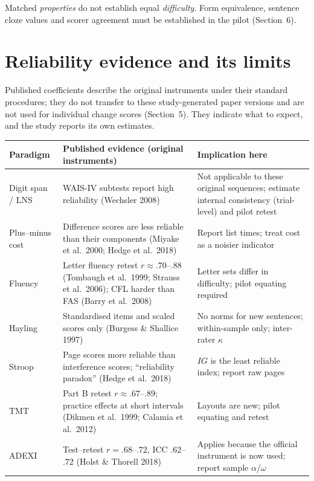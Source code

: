 \documentclass[11pt,a4paper]{article}
\begin{document}
Matched \emph{properties} do not establish equal \emph{difficulty}. Form equivalence, sentence cloze values and scorer agreement must be established in the pilot (Section~6).

\section{Reliability evidence and its limits}
Published coefficients describe the original instruments under their standard procedures; they do not transfer to these study-generated paper versions and are not used for individual change scores (Section~5). They indicate what to expect, and the study reports its own estimates.
\begin{longtable}{@{}p{3.2cm}p{5.6cm}p{6.7cm}@{}}
\toprule
Paradigm & Published evidence (original instruments) & Implication here \\ \midrule
Digit span / LNS & WAIS-IV subtests report high reliability (Wechsler 2008) & Not applicable to these original sequences; estimate internal consistency (trial-level) and pilot retest \\
Plus--minus cost & Difference scores are less reliable than their components (Miyake et al.\ 2000; Hedge et al.\ 2018) & Report list times; treat cost as a noisier indicator \\
Fluency & Letter fluency retest $r\approx .70$--$.88$ (Tombaugh et al.\ 1999; Strauss et al.\ 2006); CFL harder than FAS (Barry et al.\ 2008) & Letter sets differ in difficulty; pilot equating required \\
Hayling & Standardised items and scaled scores only (Burgess \& Shallice 1997) & No norms for new sentences; within-sample only; inter-rater $\kappa$ \\
Stroop & Page scores more reliable than interference scores; ``reliability paradox'' (Hedge et al.\ 2018) & $IG$ is the least reliable index; report raw pages \\
TMT & Part B retest $r\approx .67$--$.89$; practice effects at short intervals (Dikmen et al.\ 1999; Calamia et al.\ 2012) & Layouts are new; pilot equating and retest \\
ADEXI & Test--retest $r=.68$--$.72$, ICC $.62$--$.72$ (Holst \& Thorell 2018) & Applies because the official instrument is now used; report sample $\alpha$/$\omega$ \\
\bottomrule
\end{longtable}
\end{document}
